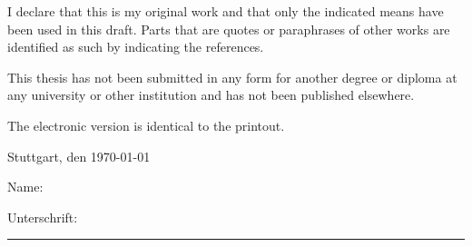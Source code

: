 
%
%
%


\vspace{1cm}

I declare that this \worksubjectEnglish{} is my original work and that only the indicated means have been used in this draft. Parts that are quotes or paraphrases of other works are identified as such by indicating the references.

This thesis has not been submitted in any form for another degree or diploma at any university or other institution and has not been published elsewhere.

The electronic version is identical to the printout.

Stuttgart, den \today

\vspace{1cm}
Name: \student

\vspace{1cm}
Unterschrift: \rule{5cm}{1pt}







